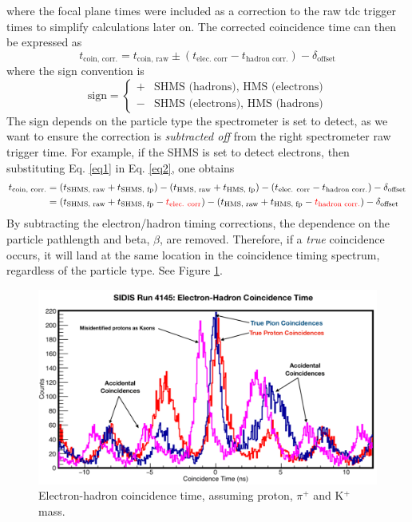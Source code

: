 \documentclass[14pt]{article}
\begin{document}
\noindent where the focal plane times were included as a correction to the raw tdc trigger times to simplify calculations later on.
The corrected coincidence time can then be expressed as
\begin{equation}\label{eq2}
t_{\text{coin, corr.}} = t_{\text{coin, raw}} \pm (t_{\text{elec. corr}} - t_{\text{hadron corr.}}) - \delta_{\text{offset}}
\end{equation}
where the sign convention is
\[ \text{sign} =
  \begin{cases}
    +  &  \text{SHMS (hadrons), HMS (electrons)}\\
    -  &  \text{SHMS (electrons), HMS (hadrons)}
  \end{cases}
  \]
  \noindent The sign depends on the particle type the spectrometer is set to detect, as we want to ensure the correction is \textit{subtracted off}
  from the right spectrometer raw trigger time. For example, if the SHMS is set to detect electrons, then substituting Eq. \ref{eq1} in Eq. \ref{eq2}, one obtains
  \begin{equation}\label{eq3}
    \begin{aligned}
      t_{\text{coin, corr.}} & = (t_{\text{SHMS, raw}} + t_{\text{SHMS, fp}}) - (t_{\text{HMS, raw}} + t_{\text{HMS, fp}}) - (t_{\text{elec. corr}} - t_{\text{hadron corr.}}) - \delta_{\text{offset}} \\
                          & = (t_{\text{SHMS, raw}} + t_{\text{SHMS, fp}} - \text{\textcolor{red}{$t_{\text{elec. corr}}$}}) - (t_{\text{HMS, raw}} + t_{\text{HMS, fp}} - \text{\textcolor{red}{$t_{\text{hadron corr.}}$}})  - \delta_{\text{offset}}
    \end{aligned}
    \end{equation}  
  \noindent By subtracting the electron/hadron timing corrections, the dependence on the particle pathlength and beta, $\beta$, are
  removed. Therefore, if a \textit{true} coincidence occurs, it will land at the same location in the coincidence timing spectrum, regardless
  of the particle type. See Figure \ref{fig:eH_Coin}. \\ \newline
  \begin{figure}
  \includegraphics[scale=0.3]{eH_Coin.pdf}
  \caption{Electron-hadron coincidence time, assuming proton, $\pi^{+}$ and K$^{+}$ mass.}
  \label{fig:eH_Coin}
  \end{figure}
\end{document}

